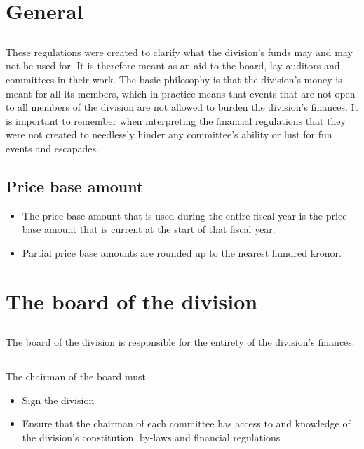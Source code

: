 \documentclass[a4paper]{dtek}
\begin{document}
\newpage

\section{General}
\subsection{}

These regulations were created to clarify what the division's funds may and may not be used for. It is therefore meant as an aid to the board, lay-auditors and committees in their work. The basic philosophy is that the division's money is meant for all its members, which in practice means that events that are not open to all members of the division are not allowed to burden the division's finances. It is important to remember when interpreting the financial regulations that they were not created to needlessly hinder any committee's ability or lust for fun events and escapades. 

\subsection{Price base amount}
\begin{itemize}
  \item The price base amount that is used during the entire fiscal year is the price base amount that is current at the start of that fiscal year. 

  \item Partial price base amounts are rounded up to the nearest hundred kronor. 
\end{itemize}

\section{The board of the division}
\subsection{}
The board of the division is responsible for the entirety of the division's finances. 

\subsection{}
The chairman of the board must
\begin{itemize}
  \item Sign the division %
  \item Ensure that the chairman of each committee has access to and knowledge of the division's constitution, by-laws and financial regulations
\end{itemize}
\end{document}

